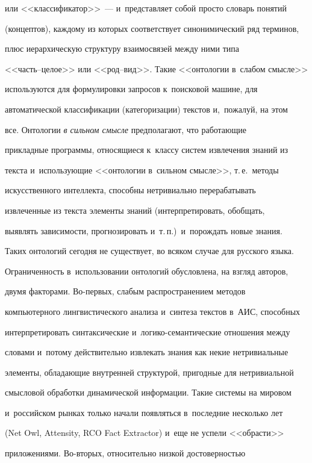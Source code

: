 или <<классификатор>>~--- и~представляет собой просто словарь понятий 


(концептов), каждому из которых соответствует синонимический ряд терминов, 


плюс иерархическую структуру взаимосвязей между ними типа  


<<часть--це\-лое>> или <<род--вид>>. Такие <<онтологии в~слабом смысле>> 


используются для формулировки запросов к~поисковой машине, для 


автоматической классификации (категоризации) текс\-тов и,~пожалуй, на этом 


все. Онтологии \textit{в сильном смысле} предполагают, что работающие 


прикладные программы, относящиеся к~классу систем извлечения знаний из 


текста и~использующие <<онтологии в~сильном смысле>>, т.\,е.\ методы 


искусственного интеллекта, способны нетривиально перерабатывать 


извлеченные из текста элементы знаний (интерпретировать, обобщать, 


выявлять зависимости, прогнозировать и~т.\,п.)\ и~порождать новые знания. 


Таких онтологий сегодня не существует, во всяком случае для русского языка.


  


  Ограниченность в~использовании онтологий обусловлена, на взгляд авторов, 


двумя факторами. Во-пер\-вых, слабым распространением методов 


компьютерного лингвистического анализа и~синтеза текстов в~АИС, способных 


интерпретировать синтаксические и~логико-семантические отношения между 


словами и~потому действительно извлекать знания как некие нетривиальные 


элементы, обладающие внутренней структурой, пригодные для нетривиальной 


смысловой обработки динамической информации. Такие системы на мировом 


и~российском рынках только начали появляться в~последние несколько лет 


(Net Owl, Attensity, RCO Fact Extractor) и~еще не успели <<обрасти>> 


приложениями. Во-вто\-рых, относительно низкой достоверностью 


